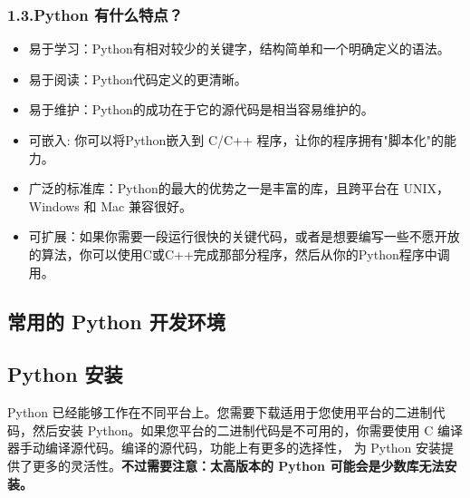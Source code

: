 \subsubsection{1.3.Python 有什么特点？}

\begin{itemize}
\item 易于学习：Python有相对较少的关键字，结构简单和一个明确定义的语法。
\item 易于阅读：Python代码定义的更清晰。
\item 易于维护：Python的成功在于它的源代码是相当容易维护的。
\item 可嵌入: 你可以将Python嵌入到 C/C++ 程序，让你的程序拥有"脚本化"的能力。
\item 广泛的标准库：Python的最大的优势之一是丰富的库，且跨平台在 UNIX，Windows 和 Mac 兼容很好。
\item 可扩展：如果你需要一段运行很快的关键代码，或者是想要编写一些不愿开放的算法，你可以使用C或C++完成那部分程序，然后从你的Python程序中调用。
\end{itemize}


\subsection{常用的 Python 开发环境}

\subsection{Python 安装} \label{sub_Python_2}

Python 已经能够工作在不同平台上。您需要下载适用于您使用平台的二进制代码，然后安装 Python。如果您平台的二进制代码是不可用的，你需要使用 C 编译器手动编译源代码。编译的源代码，功能上有更多的选择性， 为 Python 安装提供了更多的灵活性。\textbf{不过需要注意：太高版本的 Python 可能会是少数库无法安装。}

